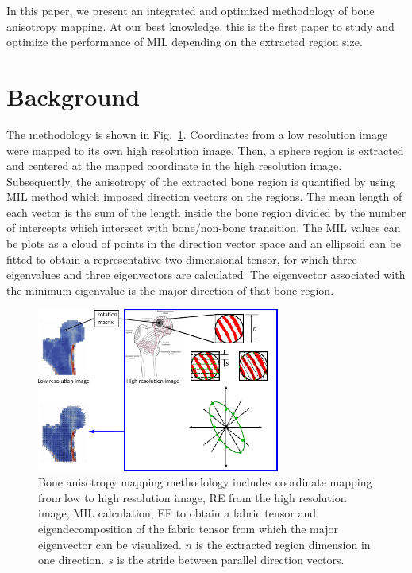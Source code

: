 \documentclass[letterpaper]{article}
\begin{document}
In this paper, we present an integrated and optimized methodology of bone anisotropy mapping. At our best knowledge, this is the first paper to study and optimize the performance of MIL depending on the extracted region size.
  
\section{Background}\label{sec:background}
The methodology is shown in Fig.~\ref{fig:method}. Coordinates from a low resolution image were mapped to its own high resolution image. Then, a sphere region is extracted and centered at the mapped coordinate in the high resolution image. 
Subsequently, the anisotropy of the extracted bone region is quantified by using MIL method which imposed direction vectors on the regions. The mean length of each vector is the sum of the length inside the bone region divided by the number of intercepts which intersect with bone/non-bone transition.
The MIL values can be plots as a cloud of points in the direction vector space and an ellipsoid can be fitted to obtain a representative two dimensional tensor, for which three eigenvalues and three eigenvectors are calculated. The eigenvector associated with the minimum eigenvalue is the major direction of that bone region.

\begin{figure}[ht]
  \centering
  \includegraphics[width=3.15in]{figs/overview.pdf}
  \caption{Bone anisotropy mapping methodology includes coordinate mapping from low to high resolution image, RE from the high resolution image, MIL calculation, EF to obtain a fabric tensor and eigendecomposition of the fabric tensor from which the major eigenvector can be visualized. $n$ is the extracted region dimension in one direction. $s$ is the stride between parallel direction vectors.}
  \label{fig:method}
\end{figure}
\end{document}
